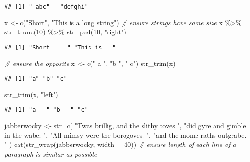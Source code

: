 \documentclass[
]{article}
\newenvironment{Shaded}{\begin{snugshade}}{\end{snugshade}}
\newcommand{\AttributeTok}[1]{\textcolor[rgb]{0.77,0.63,0.00}{#1}}
\newcommand{\CommentTok}[1]{\textcolor[rgb]{0.56,0.35,0.01}{\textit{#1}}}
\newcommand{\DecValTok}[1]{\textcolor[rgb]{0.00,0.00,0.81}{#1}}
\newcommand{\FunctionTok}[1]{\textcolor[rgb]{0.00,0.00,0.00}{#1}}
\newcommand{\NormalTok}[1]{#1}
\newcommand{\OtherTok}[1]{\textcolor[rgb]{0.56,0.35,0.01}{#1}}
\newcommand{\SpecialCharTok}[1]{\textcolor[rgb]{0.00,0.00,0.00}{#1}}
\newcommand{\StringTok}[1]{\textcolor[rgb]{0.31,0.60,0.02}{#1}}
\begin{document}
\begin{verbatim}
## [1] " abc"   "defghi"
\end{verbatim}

\begin{Shaded}
\begin{Highlighting}[]
\NormalTok{x }\OtherTok{\textless{}{-}} \FunctionTok{c}\NormalTok{(}\StringTok{"Short"}\NormalTok{, }\StringTok{"This is a long string"}\NormalTok{)}
\CommentTok{\# ensure strings have same size}
\NormalTok{x }\SpecialCharTok{\%\textgreater{}\%} 
  \FunctionTok{str\_trunc}\NormalTok{(}\DecValTok{10}\NormalTok{) }\SpecialCharTok{\%\textgreater{}\%} 
  \FunctionTok{str\_pad}\NormalTok{(}\DecValTok{10}\NormalTok{, }\StringTok{"right"}\NormalTok{)}
\end{Highlighting}
\end{Shaded}

\begin{verbatim}
## [1] "Short     " "This is..."
\end{verbatim}

\begin{Shaded}
\begin{Highlighting}[]
\CommentTok{\# ensure the opposite}
\NormalTok{x }\OtherTok{\textless{}{-}} \FunctionTok{c}\NormalTok{(}\StringTok{"  a   "}\NormalTok{, }\StringTok{"b   "}\NormalTok{,  }\StringTok{"   c"}\NormalTok{)}
\FunctionTok{str\_trim}\NormalTok{(x)}
\end{Highlighting}
\end{Shaded}

\begin{verbatim}
## [1] "a" "b" "c"
\end{verbatim}

\begin{Shaded}
\begin{Highlighting}[]
\FunctionTok{str\_trim}\NormalTok{(x, }\StringTok{"left"}\NormalTok{)}
\end{Highlighting}
\end{Shaded}

\begin{verbatim}
## [1] "a   " "b   " "c"
\end{verbatim}

\begin{Shaded}
\begin{Highlighting}[]
\NormalTok{jabberwocky }\OtherTok{\textless{}{-}} \FunctionTok{str\_c}\NormalTok{(}
  \StringTok{"\textasciigrave{}Twas brillig, and the slithy toves "}\NormalTok{,}
  \StringTok{"did gyre and gimble in the wabe: "}\NormalTok{,}
  \StringTok{"All mimsy were the borogoves, "}\NormalTok{,}
  \StringTok{"and the mome raths outgrabe. "}
\NormalTok{)}
\FunctionTok{cat}\NormalTok{(}\FunctionTok{str\_wrap}\NormalTok{(jabberwocky, }\AttributeTok{width =} \DecValTok{40}\NormalTok{)) }\CommentTok{\# ensure length of each line of a paragraph is similar as possible}
\end{Highlighting}
\end{Shaded}
\end{document}
